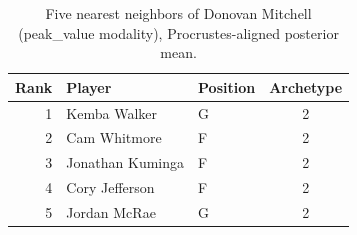\begin{table}[htbp]
  \centering\small
  \begin{tabular}{rllc}
    \toprule
    Rank & Player & Position & Archetype \\
    \midrule
    1 & Kemba Walker & G & 2 \\
    2 & Cam Whitmore & F & 2 \\
    3 & Jonathan Kuminga & F & 2 \\
    4 & Cory Jefferson & F & 2 \\
    5 & Jordan McRae & G & 2 \\
    \bottomrule
  \end{tabular}
  \caption{Five nearest neighbors of Donovan Mitchell (peak_value modality), Procrustes-aligned posterior mean.}
  \label{tab:Donovan_Mitchell_neighbors_peak_value}
\end{table}

